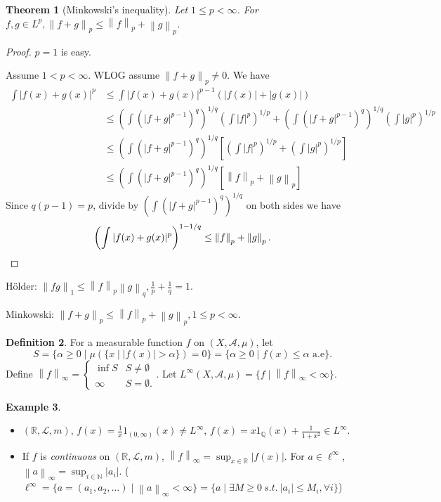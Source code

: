 \documentclass{report}
\newcommand{\R}{\mathbb{R}}
\newcommand{\Q}{\mathbb{Q}}
\newcommand{\N}{\mathbb{N}}
\newcommand{\st}{\ s.t.\ }
\newcommand{\cA}{\mathcal{A}}
\newcommand{\cL}{\mathcal{L}}
\newcommand{\norm}[1]{\left\| #1 \right\|}
\newtheorem{theorem}{Theorem}[chapter]
\theoremstyle{definition}
\newtheorem{definition}[theorem]{Definition}
\newtheorem{example}[theorem]{Example}
\theoremstyle{remark}
\newcommand{\fnl}{\parbox[t]{0\linewidth}{}}
\begin{document}
\begin{theorem}[Minkowski's inequality]
	Let $1 \leq p < \infty$. For $f, g \in L^p, \norm{f + g}_p \leq \norm{f}_p + \norm{g}_p$.
\end{theorem}
\begin{proof}
	$p = 1$ is easy.

	Assume $1 < p < \infty$. WLOG assume $\norm{f + g}_p \neq 0$.
	We have
	\begin{align*}
		\int |f(x) + g(x)|^p & \leq \int |f(x) + g(x)|^{p - 1}(|f(x)| + |g(x)|) \\
		& \leq \left(\int (|f + g|^{p-1})^q\right)^{1 / q}\left(\int |f|^p\right)^{1 / p} + \left(\int (|f + g|^{p-1})^q\right)^{1 / q}\left(\int |g|^p\right)^{1 / p} \\
		& \leq \left(\int (|f + g|^{p-1})^q\right)^{1 / q} \left[\left(\int |f|^p\right)^{1 / p}  + \left(\int |g|^p\right)^{1 / p} \right] \\
		& \leq \left(\int (|f + g|^{p-1})^q\right)^{1 / q} \left[\norm{f}_p  + \norm{g}_p\right]
	\end{align*}
	Since $q(p-1) = p$, divide by $\left(\int (|f + g|^{p-1})^q\right)^{1 / q}$ on both sides we have
	\[
	\left(\int |f(x) + g(x)|^p\right)^{1 - 1/q} \leq \norm{f}_p + \norm{g}_p. \qedhere
	\]	
\end{proof}

Hölder: $\norm{fg}_1 \leq \norm{f}_p\norm{g}_q, \frac{1}{p} + \frac{1}{q} = 1$.

Minkowski: $\norm{f + g}_p \leq \norm{f}_p + \norm{g}_p, 1 \leq p < \infty$.
\begin{definition}
	For a measurable function $f$ on $(X, \cA, \mu)$, let \[S = \{\alpha \geq 0 \mid \mu(\{x \mid |f(x)| > \alpha \}) = 0\} = \{\alpha \geq 0 \mid f(x) \leq \alpha \text{ a.e}\}.\]
	Define $\norm{f}_\infty = \begin{cases}
		\inf S & S \neq \emptyset \\
		\infty & S = \emptyset.
	\end{cases}$. Let $L^\infty(X, \cA, \mu) = \{f \mid \norm{f}_\infty < \infty\}$.
\end{definition}
\begin{example}\fnl
	\begin{itemize}
		\item $(\R, \cL, m)$, $f(x) = \frac{1}{x} 1_{(0, \infty)}(x) \neq L^\infty$, $f(x) = x1_{\Q}(x) + \frac{1}{1 + x^2} \in L^\infty$.
		\item If $f$ is \emph{continuous} on $(\R, \cL, m)$, $\norm{f}_\infty = \sup_{x \in \R} |f(x)|$. For $a \in \ell^\infty$, $\norm{a}_\infty = \sup_{i \in \N} |a_i|$. ($\ell^\infty = \{a = (a_1, a_2, \ldots) \mid \norm{a}_\infty < \infty\} = \{a \mid  \exists M \geq 0 \st |a_i| \leq M_i, \forall i\}$)
	\end{itemize}
\end{example}
\end{document}
